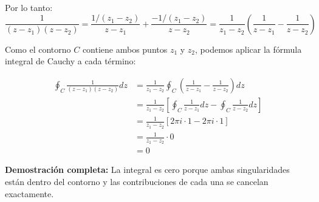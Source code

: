 \documentclass{article}
\begin{document}
Por lo tanto:
$$\frac{1}{(z - z_1)(z - z_2)} = \frac{1/(z_1 - z_2)}{z - z_1} + \frac{-1/(z_1 - z_2)}{z - z_2} = \frac{1}{z_1 - z_2}\left(\frac{1}{z - z_1} - \frac{1}{z - z_2}\right)$$

Como el contorno $C$ contiene ambos puntos $z_1$ y $z_2$, podemos aplicar la fórmula integral de Cauchy a cada término:

\begin{align*}
\oint_C \frac{1}{(z - z_1)(z - z_2)} dz &= \frac{1}{z_1 - z_2} \oint_C \left(\frac{1}{z - z_1} - \frac{1}{z - z_2}\right) dz \\
                                         &= \frac{1}{z_1 - z_2} \left[\oint_C \frac{1}{z - z_1} dz - \oint_C \frac{1}{z - z_2} dz\right] \\
                                         &= \frac{1}{z_1 - z_2} \left[2\pi i \cdot 1 - 2\pi i \cdot 1\right] \\
                                         &= \frac{1}{z_1 - z_2} \cdot 0 \\
                                         &= 0
\end{align*}

\textbf{Demostración completa:} La integral es cero porque ambas singularidades están dentro del contorno y las contribuciones de cada una se cancelan exactamente.
\end{document}
